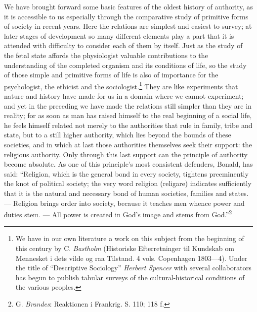 \documentclass[12pt,a4paper,openany]{book}
\newcommand{\opage}[1]{\marginnote{\footnotesize\textit{[#1]}}}
\begin{document}
We have brought forward some basic features of the oldest history of
authority, as it is accessible to us especially through the comparative %
study of primitive forms of society in recent years. Here the relations are simplest
and easiest to survey; at later stages of development so many different
elements play a part that it is attended with difficulty to consider each of
them by itself. Just as the study of the fetal state affords the physiologist
valuable contributions to the understanding of the completed organism and its
conditions of life, so the study of those simple and primitive forms of life
is also of importance for the psychologist, the ethicist and the
sociologist.\footnote[2]{We have in our own literature a work on this subject
from the beginning of this century by C. \emph{Bastholm} (Historiske
Efterretninger til Kundskab om Mennesket i dets vilde og raa Tilstand. 4 vols.
Copenhagen 1803---4). Under the title of ``Descriptive Sociology''
\emph{Herbert Spencer} with several collaborators has begun to publish tabular
surveys of the cultural-historical conditions of the various peoples.} They
are like experiments that nature and history have made for us in a domain
where we \opage{64}cannot experiment; and yet in the preceding we have made
the relations still simpler than they are in reality; for as soon as man has
raised himself to the real beginning of a social life, he feels himself
related not merely to the authorities that rule in family, tribe and state,
but to a still higher authority, which lies beyond the bounds of these
societies, and in which at last those authorities themselves seek their
support: the religious authority. Only through this last support can the
principle of authority become absolute. As one of this principle's most
consistent defenders, Bonald, has said: ``Religion, which is the general bond
in every society, tightens preeminently the knot of political society; the
very word religion (religare) indicates sufficiently that it is the natural
and necessary bond of human societies, families and states. --- Religion
brings order into society, because it teaches men whence power and duties
stem. --- All power is created in God's image and stems from
God.''\footnote[1]{G. \emph{Brandes}: Reaktionen i Frankrig. S. 110; 118 f.}
\end{document}
